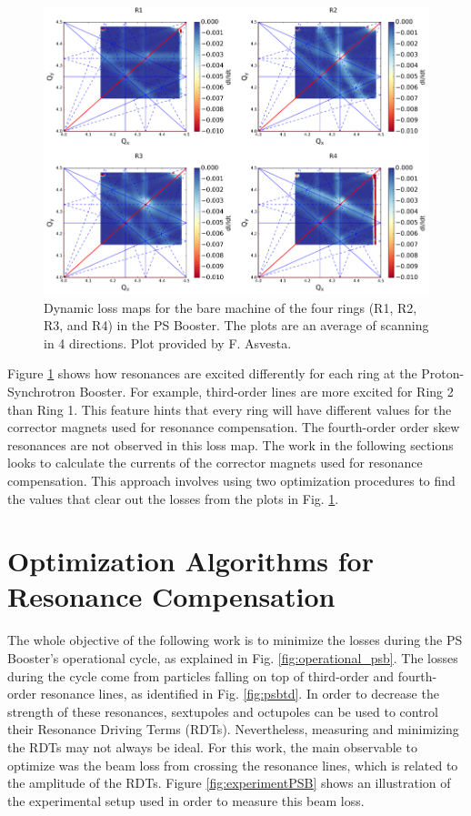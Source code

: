 \begin{figure}[H]
    \centering
    \includegraphics[width=\columnwidth]{chapter5/bare.png}
    \caption{Dynamic loss maps for the bare machine of the four rings (R1, R2, R3, and R4) in the PS Booster. The plots are an average of scanning in 4 directions. Plot provided by F. Asvesta.}
    \label{fig:bare_psb}
   \vspace{-1.25em}
\end{figure}

Figure \ref{fig:bare_psb} shows how resonances are excited differently for each ring at the Proton-Synchrotron Booster. For example, third-order lines are more excited for Ring 2 than Ring 1. This feature hints that every ring will have different values for the corrector magnets used for resonance compensation. The fourth-order order skew resonances are not observed in this loss map. The work in the following sections looks to calculate the currents of the corrector magnets used for resonance compensation. This approach involves using two optimization procedures to find the values that clear out the losses from the plots in Fig. \ref{fig:bare_psb}.

\section{Optimization Algorithms for Resonance Compensation}

The whole objective of the following work is to minimize the losses during the PS Booster's operational cycle, as explained in Fig. \ref{fig:operational_psb}. The losses during the cycle come from particles falling on top of third-order and fourth-order resonance lines, as identified in Fig. \ref{fig:psbtd}. In order to decrease the strength of these resonances, sextupoles and octupoles can be used to control their Resonance Driving Terms (RDTs). Nevertheless, measuring and minimizing the RDTs may not always be ideal. For this work, the main observable to optimize was the beam loss from crossing the resonance lines, which is related to the amplitude of the RDTs. Figure \ref{fig:experimentPSB} shows an illustration of the experimental setup used in order to measure this beam loss.

